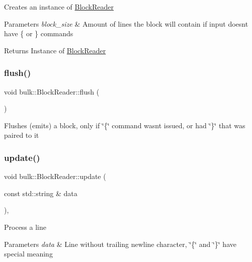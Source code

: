 Creates an instance of \hyperlink{classbulk_1_1BlockReader}{Block\+Reader} 
\begin{DoxyParams}{Parameters}
{\em block\+\_\+size} & Amount of lines the block will contain if input doesn\textquotesingle{}t have \{ or \} commands \\
\hline
\end{DoxyParams}
\begin{DoxyReturn}{Returns}
Instance of \hyperlink{classbulk_1_1BlockReader}{Block\+Reader} 
\end{DoxyReturn}
\mbox{\label{classbulk_1_1BlockReader_a03c580cc41ffd5e3d1271eddba9ca261}} 
\subsubsection{\texorpdfstring{flush()}{flush()}}
{\footnotesize\ttfamily void bulk\+::\+Block\+Reader\+::flush (\begin{DoxyParamCaption}{ }\end{DoxyParamCaption})}

Flushes (emits) a block, only if \char`\"{}\{\char`\"{} command wasn\textquotesingle{}t issued, or had \char`\"{}\}\char`\"{} that was paired to it \mbox{\label{classbulk_1_1BlockReader_a0a3b9ff69552b233b037afcd7e858ef1}} 
\subsubsection{\texorpdfstring{update()}{update()}}
{\footnotesize\ttfamily void bulk\+::\+Block\+Reader\+::update (\begin{DoxyParamCaption}\item[{const std\+::string \&}]{data }\end{DoxyParamCaption})\hspace{0.3cm}{\ttfamily [override]}, {\ttfamily [virtual]}}

Process a line 
\begin{DoxyParams}{Parameters}
{\em data} & Line without trailing newline character, \char`\"{}\{\char`\"{} and \char`\"{}\}\char`\"{} have special meaning \\
\hline
\end{DoxyParams}


